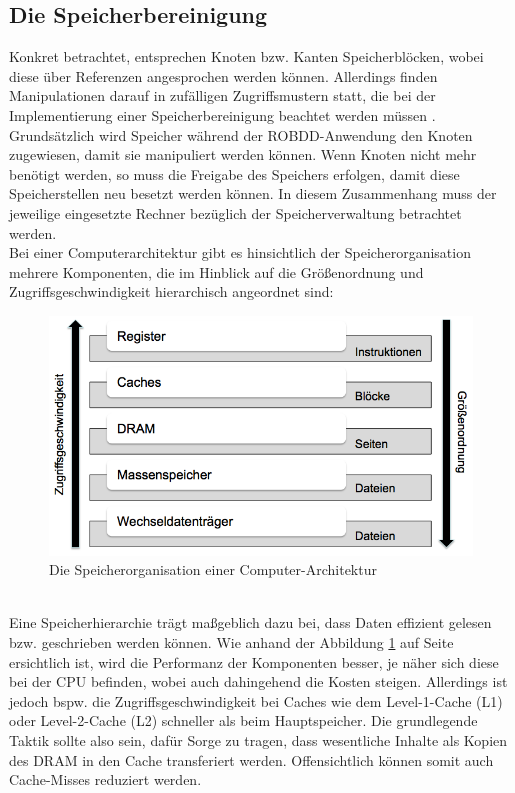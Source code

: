 \subsection{Die Speicherbereinigung}
\label{sec:speicherbereinigung}
Konkret betrachtet, entsprechen Knoten bzw. Kanten Speicherblöcken, wobei diese über Referenzen angesprochen werden können. Allerdings finden Manipulationen darauf in zufälligen Zugriffsmustern statt, die bei der Implementierung einer Speicherbereinigung beachtet werden müssen \cite[S.64]{h2002}. Grundsätzlich wird Speicher während der ROBDD-Anwendung den Knoten zugewiesen, damit sie manipuliert werden können. Wenn Knoten nicht mehr benötigt werden, so muss die Freigabe des Speichers erfolgen, damit diese Speicherstellen neu besetzt werden können. In diesem Zusammenhang muss der jeweilige eingesetzte Rechner bezüglich der Speicherverwaltung betrachtet werden.\\
Bei einer Computerarchitektur gibt es hinsichtlich der Speicherorganisation mehrere Komponenten, die im Hinblick auf die Größenordnung und Zugriffsgeschwindigkeit hierarchisch angeordnet sind:
\begin{figure}[bth]
	\centering
	\includegraphics[scale=0.5]{./img/speicher}
	\caption[Die Speicherorganisation einer Computer-Architektur]{Die Speicherorganisation einer Computer-Architektur}
	\label{fig:speicher}
\end{figure}\\
\noindent
Eine Speicherhierarchie trägt maßgeblich dazu bei, dass Daten effizient gelesen bzw. geschrieben werden können. Wie anhand der Abbildung \ref{fig:speicher} auf Seite \pageref{fig:speicher} ersichtlich ist, wird die Performanz der Komponenten besser, je näher sich diese bei der CPU befinden, wobei auch dahingehend die Kosten steigen. Allerdings ist jedoch bspw. die Zugriffsgeschwindigkeit bei Caches wie dem Level-1-Cache (L1) oder Level-2-Cache (L2) schneller als beim Hauptspeicher. Die grundlegende Taktik sollte also sein, dafür Sorge zu tragen, dass wesentliche Inhalte als Kopien des DRAM in den Cache transferiert werden. Offensichtlich können somit auch Cache-Misses reduziert werden.\\
